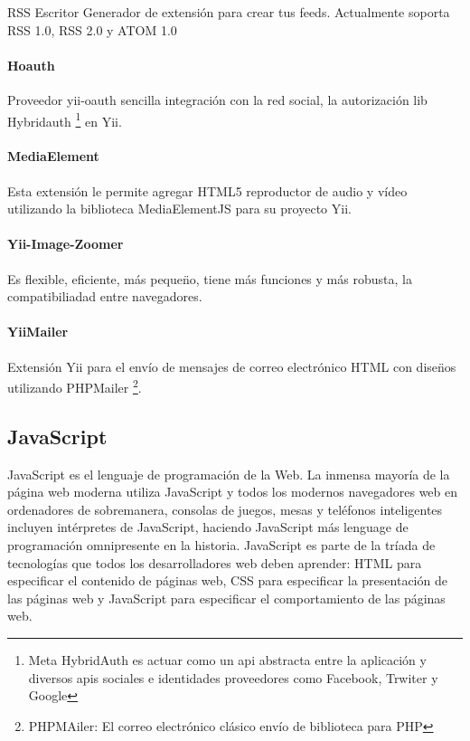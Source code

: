 RSS Escritor Generador de extensi\'{o}n para crear tus feeds. Actualmente soporta RSS 1.0, RSS 2.0 y ATOM 1.0

\paragraph{\textbf{Hoauth}}

Proveedor yii-oauth sencilla integraci\'{o}n con la red social, la autorizaci\'{o}n lib Hybridauth \footnote{Meta HybridAuth
es actuar como un api abstracta entre la aplicaci\'{o}n y diversos apis sociales e identidades proveedores como Facebook, 
Trwiter y Google} en Yii.

\paragraph{\textbf{MediaElement}}

Esta extensi\'{o}n le permite agregar HTML5 reproductor de audio y v\'{i}deo utilizando la biblioteca MediaElementJS para su
proyecto Yii.

\paragraph{\textbf{Yii-Image-Zoomer}}

Es flexible, eficiente, m\'{a}s peque\"{n}o, tiene m\'{a}s funciones y m\'{a}s robusta, la compatibiliadad entre navegadores.

\paragraph{\textbf{YiiMailer}}

Extensi\'{o}n Yii para el env\'{i}o de mensajes de correo electr\'{o}nico HTML con dise\"{n}os utilizando PHPMailer 
\footnote{PHPMAiler: El correo electr\'{o}nico cl\'{a}sico env\'{i}o de biblioteca para PHP}.


\subsection{JavaScript} 

JavaScript es el lenguaje de programaci\'{o}n de la Web. La inmensa mayor\'{i}a de la p\'{a}gina web moderna utiliza JavaScript y
todos los modernos navegadores web en ordenadores de sobremanera, consolas de juegos, mesas y tel\'{e}fonos inteligentes incluyen
int\'{e}rpretes de JavaScript, haciendo JavaScript m\'{a}s lenguage de programaci\'{o}n  omnipresente en la historia. JavaScript es
parte de la tr\'{i}ada de tecnolog\'{i}as que todos los desarrolladores web deben aprender: HTML para especificar el contenido de
p\'{a}ginas web, CSS para especificar la presentaci\'{o}n de las p\'{a}ginas web y JavaScript para especificar el comportamiento
de las p\'{a}ginas web.\cite{flanagan2006javascript}

